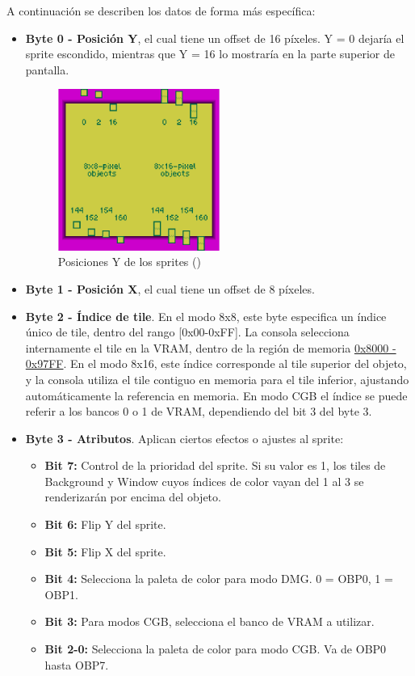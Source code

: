 A continuación se describen los datos de forma más específica:

\begin{itemize}
    \item \textbf{Byte 0 - Posición Y}, el cual tiene un offset de 16 píxeles. Y = 0 dejaría el sprite escondido, mientras que Y = 16 lo mostraría en la parte superior de pantalla.
    
    \begin{figure}[H]
        \centering
        \includegraphics[width=0.5\textwidth]{include/images/y_position.png}
        \caption{Posiciones Y de los sprites (\cite{newpandocs})}
        \label{figure:y_positions}
    \end{figure}

    \item \textbf{Byte 1 - Posición X}, el cual tiene un offset de 8 píxeles.
    \item \textbf{Byte 2 - Índice de tile}. En el modo 8x8, este byte especifica un índice único de tile, dentro del rango [0x00-0xFF]. La consola selecciona internamente el tile en la VRAM, dentro de la región de memoria \hyperref[mem:vram_1]{0x8000 - 0x97FF}. En el modo 8x16, este índice corresponde al tile superior del objeto, y la consola utiliza el tile contiguo en memoria para el tile inferior, ajustando automáticamente la referencia en memoria. En modo CGB el índice se puede referir a los bancos 0 o 1 de VRAM, dependiendo del bit 3 del byte 3.
    \item \textbf{Byte 3 - Atributos}. Aplican ciertos efectos o ajustes al sprite:
        \begin{itemize}
            \item \textbf{Bit 7:} Control de la prioridad del sprite. Si su valor es 1, los tiles de Background y Window cuyos índices de color vayan del 1 al 3 se renderizarán por encima del objeto.
            \item \textbf{Bit 6:} Flip Y del sprite.
            \item \textbf{Bit 5:} Flip X del sprite.
            \item \textbf{Bit 4:} Selecciona la paleta de color para modo DMG. 0 = OBP0, 1 = OBP1.
            \item \textbf{Bit 3:} Para modos CGB, selecciona el banco de VRAM a utilizar.
            \item \textbf{Bit 2-0:} Selecciona la paleta de color para modo CGB. Va de OBP0 hasta OBP7.
        \end{itemize}

\end{itemize}


